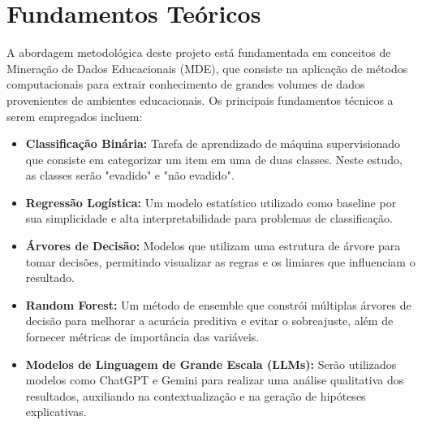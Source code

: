 \documentclass[brazilian, english, spanish]{RBIEarticle}
\begin{document}
\section{Fundamentos Teóricos}
A abordagem metodológica deste projeto está fundamentada em conceitos de Mineração de Dados Educacionais (MDE), que consiste na aplicação de métodos computacionais para extrair conhecimento de grandes volumes de dados provenientes de ambientes educacionais. Os principais fundamentos técnicos a serem empregados incluem:
\begin{itemize}
    \item \textbf{Classificação Binária:} Tarefa de aprendizado de máquina supervisionado que consiste em categorizar um item em uma de duas classes. Neste estudo, as classes serão "evadido" e "não evadido".
    \item \textbf{Regressão Logística:} Um modelo estatístico utilizado como baseline por sua simplicidade e alta interpretabilidade para problemas de classificação.
    \item \textbf{Árvores de Decisão:} Modelos que utilizam uma estrutura de árvore para tomar decisões, permitindo visualizar as regras e os limiares que influenciam o resultado.
    \item \textbf{Random Forest:} Um método de ensemble que constrói múltiplas árvores de decisão para melhorar a acurácia preditiva e evitar o sobreajuste, além de fornecer métricas de importância das variáveis.
    \item \textbf{Modelos de Linguagem de Grande Escala (LLMs):} Serão utilizados modelos como ChatGPT e Gemini para realizar uma análise qualitativa dos resultados, auxiliando na contextualização e na geração de hipóteses explicativas.
\end{itemize}
\end{document}
